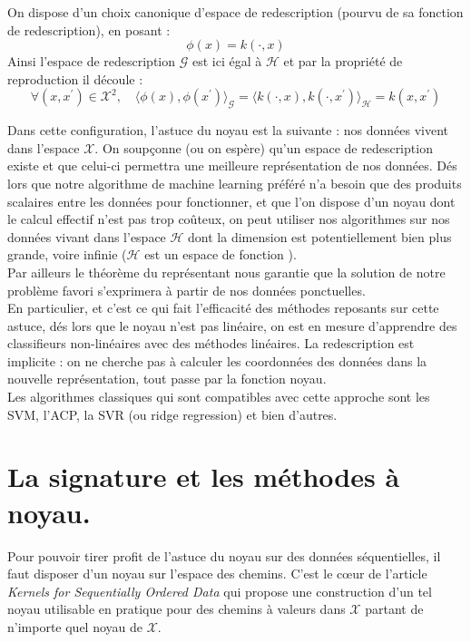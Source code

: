 \documentclass[10pt,a4paper]{article}
\begin{document}
On dispose d'un choix canonique d'espace de redescription (pourvu de sa fonction de redescription), en posant :
\[ \phi(x) = k(\cdot, x) \]
Ainsi l'espace de redescription $\mathcal{G}$ est ici égal à $\mathcal{H}$ et par la propriété de reproduction il découle :
\[ \forall (x, x^{'}) \in \mathcal{X}^2, \quad \langle \phi(x), \phi(x^{'}) \rangle_{\mathcal{G}} = \langle k(\cdot, x), k(\cdot, x^{'})\rangle_{\mathcal{H}} = k(x,x^{'}) \]

Dans cette configuration, l'astuce du noyau est la suivante : nos données vivent dans l'espace $\mathcal{X}$. On soupçonne (ou on espère) qu'un espace de redescription existe et que celui-ci permettra une meilleure représentation de nos données. Dés lors que notre algorithme de machine learning préféré n'a besoin que des produits scalaires entre les données pour fonctionner, et que l'on dispose d'un noyau dont le calcul effectif n'est pas trop coûteux, on peut utiliser nos algorithmes sur nos données vivant dans l'espace $\mathcal{H}$ dont la dimension est potentiellement bien plus grande, voire infinie ($\mathcal{H}$ est un espace de fonction ). \\
Par ailleurs le théorème du représentant nous garantie que la solution de notre problème favori s'exprimera à partir de nos données ponctuelles.\\ 

En particulier, et c'est ce qui fait l'efficacité des méthodes reposants sur cette astuce, dés lors que le noyau n'est pas linéaire, on est en mesure d'apprendre des classifieurs non-linéaires avec des méthodes linéaires. La redescription est implicite : on ne cherche pas à calculer les coordonnées des données dans la nouvelle représentation, tout passe par la fonction noyau. \\ 

Les algorithmes classiques qui sont compatibles avec cette approche sont les SVM, l'ACP, la SVR (ou ridge regression) et bien d'autres.

\section{La signature et les méthodes à noyau.}

Pour pouvoir tirer profit de l'astuce du noyau sur des données séquentielles, il faut disposer d'un noyau sur l'espace des chemins. C'est le cœur de l'article \textit{Kernels for Sequentially Ordered Data} \cite{ksod} qui propose une construction d'un tel noyau utilisable en pratique pour des chemins à valeurs dans $\mathcal{X}$ partant de n'importe quel noyau de $\mathcal{X}$. \\
\end{document}
